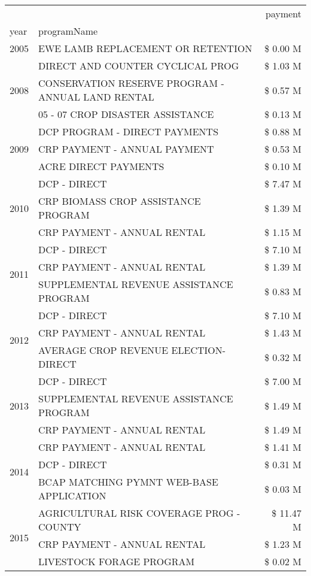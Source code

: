 \begin{tabular}{llr}
\toprule
 &  & payment \\
year & programName &  \\
\midrule
2005 & EWE LAMB REPLACEMENT OR RETENTION & \$ 0.00 M \\
\cline{1-3}
\multirow[t]{3}{*}{2008} & DIRECT AND COUNTER CYCLICAL PROG & \$ 1.03 M \\
 & CONSERVATION RESERVE PROGRAM - ANNUAL LAND RENTAL & \$ 0.57 M \\
 & 05 - 07 CROP DISASTER ASSISTANCE & \$ 0.13 M \\
\cline{1-3}
\multirow[t]{3}{*}{2009} & DCP PROGRAM - DIRECT PAYMENTS & \$ 0.88 M \\
 & CRP PAYMENT - ANNUAL PAYMENT & \$ 0.53 M \\
 & ACRE DIRECT PAYMENTS & \$ 0.10 M \\
\cline{1-3}
\multirow[t]{3}{*}{2010} & DCP - DIRECT & \$ 7.47 M \\
 & CRP BIOMASS CROP ASSISTANCE PROGRAM & \$ 1.39 M \\
 & CRP PAYMENT - ANNUAL RENTAL & \$ 1.15 M \\
\cline{1-3}
\multirow[t]{3}{*}{2011} & DCP - DIRECT & \$ 7.10 M \\
 & CRP PAYMENT - ANNUAL RENTAL & \$ 1.39 M \\
 & SUPPLEMENTAL REVENUE ASSISTANCE PROGRAM & \$ 0.83 M \\
\cline{1-3}
\multirow[t]{3}{*}{2012} & DCP - DIRECT & \$ 7.10 M \\
 & CRP PAYMENT - ANNUAL RENTAL & \$ 1.43 M \\
 & AVERAGE CROP REVENUE ELECTION-DIRECT & \$ 0.32 M \\
\cline{1-3}
\multirow[t]{3}{*}{2013} & DCP - DIRECT & \$ 7.00 M \\
 & SUPPLEMENTAL REVENUE ASSISTANCE PROGRAM & \$ 1.49 M \\
 & CRP PAYMENT - ANNUAL RENTAL & \$ 1.49 M \\
\cline{1-3}
\multirow[t]{3}{*}{2014} & CRP PAYMENT - ANNUAL RENTAL & \$ 1.41 M \\
 & DCP - DIRECT & \$ 0.31 M \\
 & BCAP MATCHING PYMNT WEB-BASE APPLICATION & \$ 0.03 M \\
\cline{1-3}
\multirow[t]{3}{*}{2015} & AGRICULTURAL RISK COVERAGE PROG - COUNTY & \$ 11.47 M \\
 & CRP PAYMENT - ANNUAL RENTAL & \$ 1.23 M \\
 & LIVESTOCK FORAGE PROGRAM & \$ 0.02 M \\

\end{tabular}
